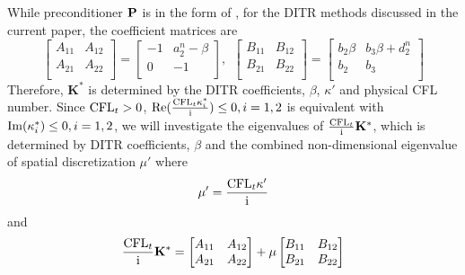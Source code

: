\documentclass[preprint,12pt]{elsarticle}
\begin{document}
While preconditioner $\mathbf{P}$ is in the form of ,
for the DITR methods discussed in the current paper,
the coefficient matrices are
\begin{equation}
    \begin{bmatrix}
        A_{11} & A_{12} \\
        A_{21} & A_{22} \\
    \end{bmatrix} = \begin{bmatrix}
        -1 & a_2^n - \beta \\
        0  & -1            \\
    \end{bmatrix},\ \
    \begin{bmatrix}
        B_{11} & B_{12} \\
        B_{21} & B_{22} \\
    \end{bmatrix} = \begin{bmatrix}
        b_2\beta & b_3\beta + d_2^n \\
        b_2      & b_3              \\
    \end{bmatrix}
    \label{eq:ABBetaForm}
\end{equation}
Therefore, $\mathbf{K}^*$ is determined by the DITR coefficients,
$\beta$, $\kappa'$ and physical CFL number.
Since $\text{CFL}_t > 0$, $\mathrm{Re}(\frac{\text{CFL}_t\kappa^*_i}{\mathrm{i}}) \leq 0, i=1,2$
is equivalent with $\mathrm{Im}(\kappa^*_i) \leq 0, i=1,2$,
we will investigate the eigenvalues of
$\frac{\text{CFL}_t}{\mathrm{i}}\mathbf{K}^*$, which is
determined by DITR coefficients, $\beta$ and the
combined non-dimensional eigenvalue of spatial  discretization $\mu'$
where
\begin{equation}
    \mu' = \frac{\text{CFL}_t \kappa'}{\mathrm{i}}
\end{equation}
and
\begin{equation}
    \frac{\text{CFL}_t}{\mathrm{i}}\mathbf{K}^* = \begin{bmatrix}
        A_{11} & A_{12} \\
        A_{21} & A_{22} \\
    \end{bmatrix} + \mu \begin{bmatrix}
        B_{11} & B_{12} \\
        B_{21} & B_{22} \\
    \end{bmatrix}
\end{equation}
\end{document}
